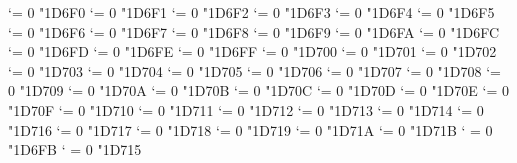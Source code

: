 {  \Umathcode `\Ο = 0 \normalfam "1D6F0 
  \Umathcode `\Π = 0 \normalfam "1D6F1 
  \Umathcode `\Ρ = 0 \normalfam "1D6F2 
  \Umathcode `\ϴ = 0 \normalfam "1D6F3 
  \Umathcode `\Σ = 0 \normalfam "1D6F4 
  \Umathcode `\Τ = 0 \normalfam "1D6F5 
  \Umathcode `\Υ = 0 \normalfam "1D6F6 
  \Umathcode `\Φ = 0 \normalfam "1D6F7 
  \Umathcode `\Χ = 0 \normalfam "1D6F8 
  \Umathcode `\Ψ = 0 \normalfam "1D6F9 
  \Umathcode `\Ω = 0 \normalfam "1D6FA 
  \Umathcode `\α = 0 \normalfam "1D6FC 
  \Umathcode `\β = 0 \normalfam "1D6FD 
  \Umathcode `\γ = 0 \normalfam "1D6FE 
  \Umathcode `\δ = 0 \normalfam "1D6FF 
  \Umathcode `\ε = 0 \normalfam "1D700 
  \Umathcode `\ζ = 0 \normalfam "1D701 
  \Umathcode `\η = 0 \normalfam "1D702 
  \Umathcode `\θ = 0 \normalfam "1D703 
  \Umathcode `\ι = 0 \normalfam "1D704 
  \Umathcode `\κ = 0 \normalfam "1D705 
  \Umathcode `\λ = 0 \normalfam "1D706 
  \Umathcode `\μ = 0 \normalfam "1D707 
  \Umathcode `\ν = 0 \normalfam "1D708 
  \Umathcode `\ξ = 0 \normalfam "1D709 
  \Umathcode `\ο = 0 \normalfam "1D70A 
  \Umathcode `\π = 0 \normalfam "1D70B 
  \Umathcode `\ρ = 0 \normalfam "1D70C 
  \Umathcode `\ς = 0 \normalfam "1D70D 
  \Umathcode `\σ = 0 \normalfam "1D70E 
  \Umathcode `\τ = 0 \normalfam "1D70F 
  \Umathcode `\υ = 0 \normalfam "1D710 
  \Umathcode `\φ = 0 \normalfam "1D711 
  \Umathcode `\χ = 0 \normalfam "1D712 
  \Umathcode `\ψ = 0 \normalfam "1D713 
  \Umathcode `\ω = 0 \normalfam "1D714 
  \Umathcode `\ϵ = 0 \normalfam "1D716 
  \Umathcode `\ϑ = 0 \normalfam "1D717 
  \Umathcode `\ϰ = 0 \normalfam "1D718 
  \Umathcode `\ϕ = 0 \normalfam "1D719 
  \Umathcode `\ϱ = 0 \normalfam "1D71A 
  \Umathcode `\ϖ = 0 \normalfam "1D71B 
  \Umathcode `\∇ = 0 \normalfam "1D6FB 
  \Umathcode `\∂ = 0 \normalfam "1D715 
\tenit}%
